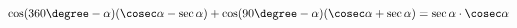 \begin{ex}[type=prove_identity]
	\begin{condition}
		\( \cos(360\degree-\alpha)(\cosec\alpha-\sec\alpha)+\cos(90\degree-\alpha)(\cosec\alpha+\sec\alpha)=\sec\alpha\cdot\cosec\alpha \)
	\end{condition}
\end{ex}